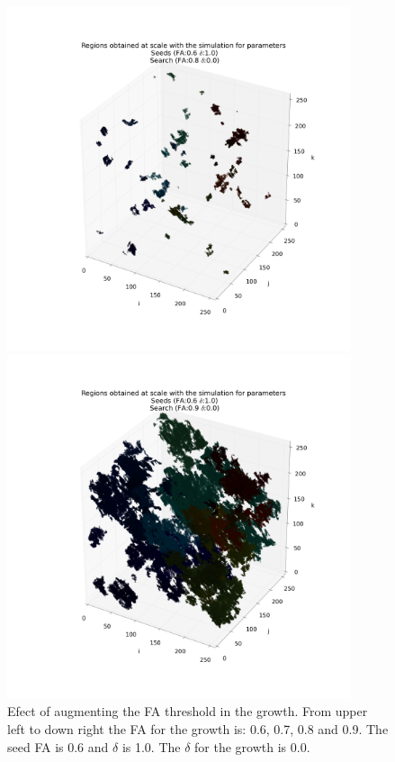 \documentclass[12pt]{article}
\begin{document}
\begin{figure}[ht]
\begin{minipage}{.45\textwidth}
\end{minipage}
\begin{minipage}{.45\textwidth}
  \centering
  \includegraphics[width=0.9\textwidth]{groups/3d/seeds_FA_6/regions_nonoise_seeds_FA_06_Trace_10_search_FA_08_Trace_00_.png}
\end{minipage}
\begin{minipage}{.45\textwidth}
  \centering
  \includegraphics[width=0.9\textwidth]{groups/3d/seeds_FA_6/regions_nonoise_seeds_FA_06_Trace_10_search_FA_09_Trace_00_.png}
\end{minipage}
\caption{Efect of augmenting the FA threshold in the growth. From upper left to down right the FA for the growth is: 0.6, 0.7, 0.8 and 0.9. The seed FA is 0.6 and $\delta$ is 1.0. The $\delta$ for the growth is 0.0.} \label{fg:3D_FA_growth}
\end{figure}
\FloatBarrier
\end{document}
